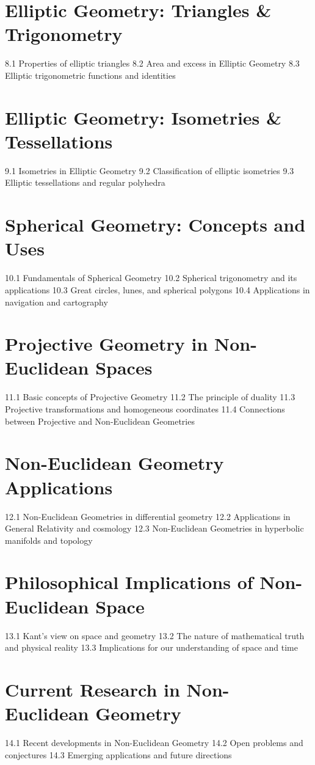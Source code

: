 \section{Elliptic Geometry: Triangles \& Trigonometry}
8.1 Properties of elliptic triangles
8.2 Area and excess in Elliptic Geometry
8.3 Elliptic trigonometric functions and identities
\section{Elliptic Geometry: Isometries \& Tessellations}
9.1 Isometries in Elliptic Geometry
9.2 Classification of elliptic isometries
9.3 Elliptic tessellations and regular polyhedra
\section{Spherical Geometry: Concepts and Uses}
10.1 Fundamentals of Spherical Geometry
10.2 Spherical trigonometry and its applications
10.3 Great circles, lunes, and spherical polygons
10.4 Applications in navigation and cartography
\section{Projective Geometry in Non-Euclidean Spaces}
11.1 Basic concepts of Projective Geometry
11.2 The principle of duality
11.3 Projective transformations and homogeneous coordinates
11.4 Connections between Projective and Non-Euclidean Geometries
\section{Non-Euclidean Geometry Applications}
12.1 Non-Euclidean Geometries in differential geometry
12.2 Applications in General Relativity and cosmology
12.3 Non-Euclidean Geometries in hyperbolic manifolds and topology
\section{Philosophical Implications of Non-Euclidean Space}
13.1 Kant's view on space and geometry
13.2 The nature of mathematical truth and physical reality
13.3 Implications for our understanding of space and time
\section{Current Research in Non-Euclidean Geometry}
14.1 Recent developments in Non-Euclidean Geometry
14.2 Open problems and conjectures
14.3 Emerging applications and future directions
